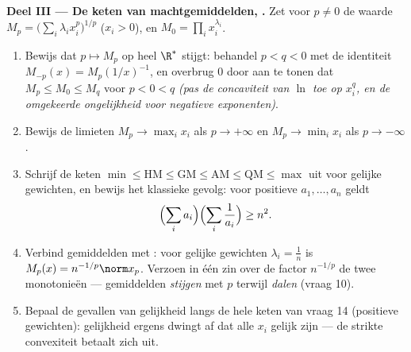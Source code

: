 \begin{problem}
\medskip
\noindent\textbf{Deel III --- De keten van machtgemiddelden,
.} Zet voor $p \neq 0$ de waarde $M_p =
\bigl(\sum_i\lambda_i x_i^p\bigr)^{1/p}$ ($x_i > 0$), en $M_0 =
\prod_i x_i^{\lambda_i}$.
\begin{enumerate}[resume]
  \item Bewijs dat $p \mapsto M_p$ op heel $\R^*$ stijgt: behandel
        $p < q < 0$ met de identiteit $M_{-p}(x) =
        M_p(1/x)^{-1}$, en overbrug $0$ door aan te tonen dat $M_p
        \leq M_0 \leq M_q$ voor $p < 0 < q$ \emph{(pas de
        concaviteit van $\ln$ toe op $x_i^q$, en de omgekeerde
        ongelijkheid voor negatieve exponenten)}.
  \item Bewijs de limieten $M_p \to \max_i x_i$ als $p \to
        +\infty$ en $M_p \to \min_i x_i$ als $p \to -\infty$.
  \item Schrijf de keten $\min \leq \mathrm{HM} \leq \mathrm{GM}
        \leq \mathrm{AM} \leq \mathrm{QM} \leq \max$ uit voor
        gelijke gewichten, en bewijs het klassieke gevolg: voor
        positieve $a_1, \dots, a_n$ geldt
        \[
        \Bigl(\sum_i a_i\Bigr)\Bigl(\sum_i\frac1{a_i}\Bigr)
        \geq n^2 .
        \]
  \item Verbind gemiddelden met : voor gelijke gewichten
        $\lambda_i = \frac1n$ is $M_p(x) = n^{-1/p}\norm x_p$.
        Verzoen in één zin over de factor $n^{-1/p}$ de twee
        monotonieën --- gemiddelden \emph{stijgen} met $p$ terwijl
         \emph{dalen} (vraag 10).
  \item Bepaal de gevallen van gelijkheid langs de hele keten van
        vraag 14 (positieve gewichten): gelijkheid ergens dwingt
        af dat alle $x_i$ gelijk zijn --- de strikte convexiteit
        betaalt zich uit.
\end{enumerate}


\end{problem}
